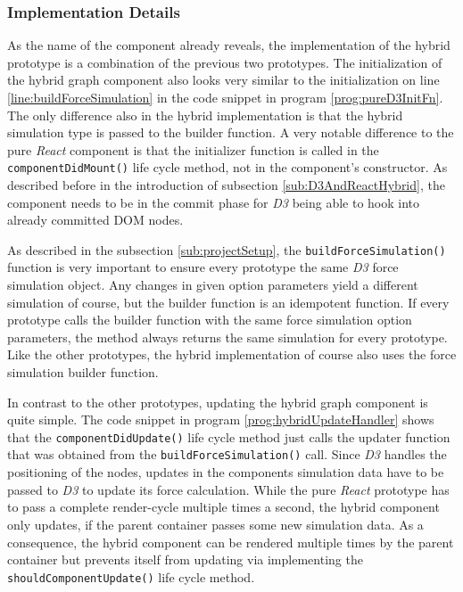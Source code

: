 \subsubsection{Implementation Details}

As the name of the component already reveals, the implementation of the hybrid prototype is a combination of the previous two prototypes. The initialization of the hybrid graph component also looks very similar to the initialization on line \ref{line:buildForceSimulation} in the code snippet in program \ref{prog:pureD3InitFn}. The only difference also in the hybrid implementation is that the hybrid simulation type is passed to the builder function. A very notable difference to the pure \emph{React} component is that the initializer function is called in the \texttt{componentDidMount()} life cycle method, not in the component's constructor. As described before in the introduction of subsection \ref{sub:D3AndReactHybrid}, the component needs to be in the commit phase for \emph{D3} being able to hook into already committed DOM nodes.

As described in the subsection \ref{sub:projectSetup}, the \texttt{buildForceSimulation()} function is very important to ensure every prototype the same \emph{D3} force simulation object. Any changes in given option parameters yield a different simulation of course, but the builder function is an idempotent function. If every prototype calls the builder function with the same force simulation option parameters, the method always returns the same simulation for every prototype. Like the other prototypes, the hybrid implementation of course also uses the force simulation builder function.

In contrast to the other prototypes, updating the hybrid graph component is quite simple. The code snippet in program \ref{prog:hybridUpdateHandler} shows that the \texttt{componentDidUpdate()} life cycle method just calls the updater function that was obtained from the \texttt{build\linebreak[0]{}Force\linebreak[0]{}Simulation()} call. Since \emph{D3} handles the positioning of the nodes, updates in the components simulation data have to be passed to \emph{D3} to update its force calculation. While the pure \emph{React} prototype has to pass a complete render-cycle multiple times a second, the hybrid component only updates, if the parent container passes some new simulation data. As a consequence, the hybrid component can be rendered multiple times by the parent container but prevents itself from updating via implementing the \texttt{shouldComponentUpdate()} life cycle method.

